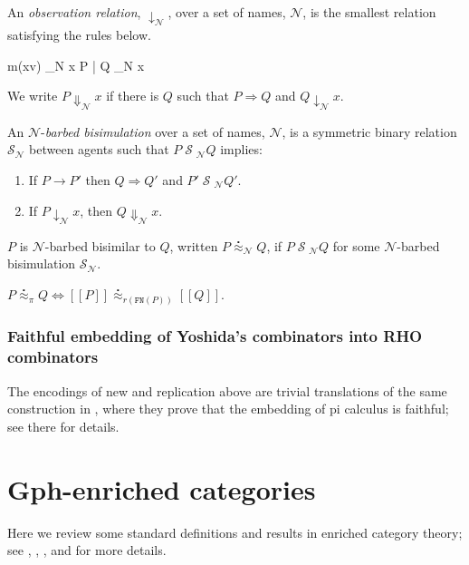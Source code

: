 \documentclass{llncs}
\newcommand{\ldb}{[\![}
\newcommand{\rdb}{]\!]}
\newcommand{\wbbisim}{\stackrel{\centerdot}{\approx}} %
\newcommand{\nameeq}{\mathbin{\equiv_N}}
\newcommand{\binpar}[2]{#1 | #2}
\newcommand{\prefix}[3]{#1?(#2) . #3}
\newcommand{\rel}[1]{\;{\mathcal #1}\;} %
\newcommand{\red}{\rightarrow}
\newcommand{\wred}{\Rightarrow}
\newcommand{\rhoc}{$\rho$-calculus}
\begin{document}
\begin{definition}
An \emph{observation relation}, $\downarrow_{\mathcal N}$, over a set
of names, $\mathcal N$, is the smallest relation satisfying the rules
below.

\infrule[Out-barb]{y \in {\mathcal N}, \; x \nameeq y}
		  {m(xv) \downarrow_{\mathcal N} x}
		  {\binpar{P}{Q} \downarrow_{\mathcal N} x}

We write $P \Downarrow_{\mathcal N} x$ if there is $Q$ such that 
$P \wred Q$ and $Q \downarrow_{\mathcal N} x$.
\end{definition}


\begin{definition}
An  ${\mathcal N}$-\emph{barbed bisimulation} over a set of names, ${\mathcal N}$, is a symmetric binary relation 
${\mathcal S}_{\mathcal N}$ between agents such that $P\rel{S}_{\mathcal N}Q$ implies:
\begin{enumerate}
\item If $P \red P'$ then $Q \wred Q'$ and $P'\rel{S}_{\mathcal N} Q'$.
\item If $P\downarrow_{\mathcal N} x$, then $Q\Downarrow_{\mathcal N} x$.
\end{enumerate}
$P$ is ${\mathcal N}$-barbed bisimilar to $Q$, written
$P \wbbisim_{\mathcal N} Q$, if $P \rel{S}_{\mathcal N} Q$ for some ${\mathcal N}$-barbed bisimulation ${\mathcal S}_{\mathcal N}$.
\end{definition}

	$P \wbbisim_{\pi} Q \iff \ldb P \rdb \wbbisim_{r(\texttt{FN}(P))} \ldb Q \rdb$.

\subsubsection{Faithful embedding of Yoshida's combinators into RHO combinators}

The encodings of new and replication above are trivial translations of the same construction in \cite{DBLP:journals/entcs/MeredithR05}, where they prove that the embedding of pi calculus is faithful; see there for details.

\section{Gph-enriched categories}
Here we review some standard definitions and results in enriched category theory; see \cite{CIS-335497}, \cite{Power99EnrichedLawvereTheories}, \cite{DBLP:journals/acs/LackR11}, and \cite{Trimble} for more details.
\end{document}
